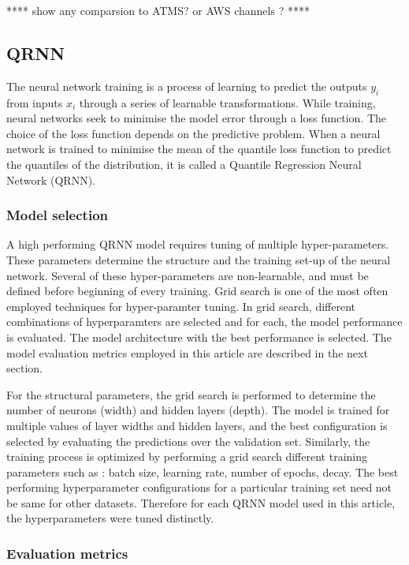 \documentclass[amt, manuscript]{copernicus}
\begin{document}
**** show any comparsion to ATMS? or AWS channels ? ****

\subsection{QRNN}
%
The neural network training is a process of learning to predict the outputs {$y_i$} from inputs {$x_i$} through a series of learnable transformations. While training, neural networks seek to minimise the model error through a loss function. The choice of the loss function depends on the predictive problem. When a neural network is trained to minimise the mean of the quantile loss function to predict the quantiles of the distribution, it is called a Quantile Regression Neural Network (QRNN). 

 
\subsubsection{Model selection}
%
\label{model_selection}
A high performing QRNN model requires tuning of multiple hyper-parameters. These parameters determine the structure and the training set-up of the neural network. Several of these hyper-parameters are non-learnable, and must be defined before beginning of every training. Grid search is one of the most often employed techniques for hyper-paramter tuning. In grid search, different combinations of hyperparamters are selected and for each, the model performance is evaluated. The model architecture with the best performance is selected. The model evaluation metrics employed in this article are described in the next section. 

For the structural parameters, the grid search is performed to determine the number of neurons (width) and hidden layers (depth). The model is trained for multiple values of layer widths and hidden layers, and the best configuration is selected by evaluating the predictions over the validation set. Similarly, the training process is optimized by performing a grid search different training parameters such as : batch size, learning rate, number of epochs, decay. The best performing hyperparameter configurations for a particular training set need not be same for other datasets. Therefore for each QRNN model used in this article, the hyperparameters were tuned distinctly. 

\subsubsection{Evaluation metrics}
\end{document}
